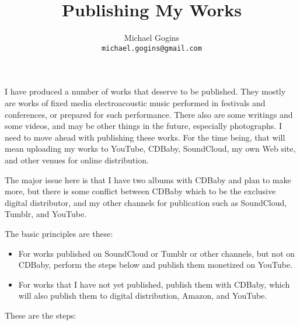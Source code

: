 \documentclass[english,11pt,letterpaper,onecolumn]{scrartcl}
\begin{document}
\title{Publishing My Works}
\author{Michael Gogins \\ \texttt{michael.gogins@gmail.com}}
\maketitle


I have produced a number of works that deserve to be published. They mostly are works of fixed media electroacoustic music performed in festivals and conferences, or prepared for such performance. There also are some writings and some videos, and may be other things in the future, especially photographs. I need to move ahead with publishing these works. For the time being, that will mean uploading my works to YouTube, CDBaby, SoundCloud, my own Web site, and other venues for online distribution.

The major issue here is that I have two albums with CDBaby and plan to make more, but there is some conflict between CDBaby which to be the exclusive digital distributor, and my other channels for publication such as SoundCloud, Tumblr, and YouTube.

The basic principles are these:

\begin{itemize}
	\item For works published on SoundCloud or Tumblr or other channels, but not on CDBaby, perform the steps below and publish them monetized on YouTube.
	\item For works that I have not yet published, publish them with CDBaby, which will also publish them to digital distribution, Amazon, and YouTube.
\end{itemize}

These are the steps:
\end{document}
